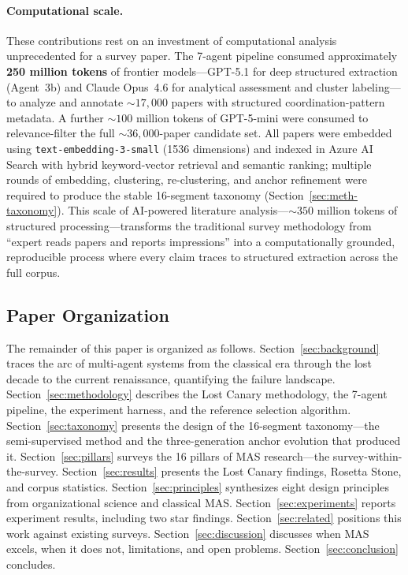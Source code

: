 \documentclass{article}
\begin{document}
\paragraph{Computational scale.}
These contributions rest on an investment of computational analysis unprecedented for a
survey paper. The 7-agent pipeline consumed approximately \textbf{250 million tokens}
of frontier models---GPT-5.1 for deep structured extraction (Agent~3b) and Claude
Opus~4.6 for analytical assessment and cluster labeling---to analyze and annotate
${\sim}17{,}000$ papers with structured coordination-pattern metadata. A further
${\sim}100$ million tokens of GPT-5-mini were consumed to relevance-filter the full
${\sim}36{,}000$-paper candidate set. All papers were embedded using
\texttt{text-embedding-3-small} (1536 dimensions) and indexed in Azure AI Search with
hybrid keyword-vector retrieval and semantic ranking; multiple rounds of embedding,
clustering, re-clustering, and anchor refinement were required to produce the stable
16-segment taxonomy (Section~\ref{sec:meth-taxonomy}). This scale of AI-powered
literature analysis---${\sim}350$ million tokens of structured processing---transforms
the traditional survey methodology from ``expert reads papers and reports impressions''
into a computationally grounded, reproducible process where every claim traces to
structured extraction across the full corpus.

\subsection{Paper Organization}
\label{sec:intro-organization}

The remainder of this paper is organized as follows.
Section~\ref{sec:background} traces the arc of multi-agent systems from the classical era
through the lost decade to the current renaissance, quantifying the failure landscape.
Section~\ref{sec:methodology} describes the Lost Canary methodology, the 7-agent
pipeline, the experiment harness, and the reference selection algorithm.
Section~\ref{sec:taxonomy} presents the design of the 16-segment taxonomy---the
semi-supervised method and the three-generation anchor evolution that produced it.
Section~\ref{sec:pillars} surveys the 16 pillars of MAS research---the
survey-within-the-survey.
Section~\ref{sec:results} presents the Lost Canary findings, Rosetta Stone, and corpus
statistics.
Section~\ref{sec:principles} synthesizes eight design principles from organizational
science and classical MAS.
Section~\ref{sec:experiments} reports experiment results, including two star findings.
Section~\ref{sec:related} positions this work against existing surveys.
Section~\ref{sec:discussion} discusses when MAS excels, when it does not, limitations,
and open problems.
Section~\ref{sec:conclusion} concludes.
\end{document}
